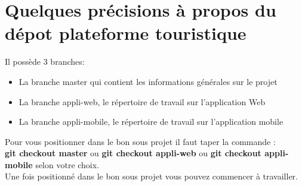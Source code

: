 \documentclass[a4paper, 12pt, openany]{report}
\begin{document}
\section*{Quelques précisions à propos du dépot plateforme touristique}
Il possède 3 branches:
\begin{itemize}
\item La branche master qui contient les informations générales sur le projet
\item La branche appli-web, le répertoire de travail sur l'application Web
\item La branche appli-mobile, le répertoire de travail sur l'application mobile\\
\end{itemize}
Pour vous positionner dans le bon sous projet il faut taper la commande : \\
 \textbf{git checkout master } ou  \textbf{git checkout appli-web} ou  \textbf{git checkout appli-mobile} selon votre choix.\\
Une fois positionné dans le bon sous projet vous pouvez commencer à travailler.
\end{document}
